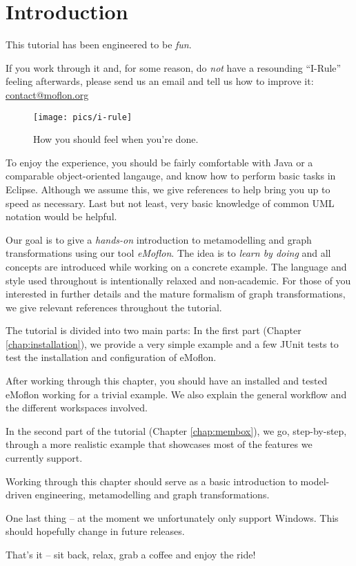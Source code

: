 \chapter{Introduction}
\label{chap:introduction}

This tutorial has been engineered to be \emph{fun}.

If you work through it and, for some reason, do \emph{not} have a resounding
``I-Rule'' feeling afterwards, please send us an email and tell us how to improve it:
\url{contact@moflon.org}

\begin{figure}[htp]
\begin{center}
  \texttt{[image: pics/i-rule]}
  \caption{How you should feel when you're done.}
  \label{i-rule}
\end{center}
\end{figure}

\newpage 

To enjoy the experience, you should be fairly comfortable with Java or
a comparable object-oriented langauge, and know how to perform basic tasks
in Eclipse.  Although we assume this, we give references to help bring you up to
speed as necessary.  Last but not least, very basic knowledge of
common UML notation would be helpful.

Our goal is to give a \emph{hands-on} introduction to metamodelling and graph
transformations using our tool \emph{eMoflon}.
The idea is to \emph{learn by doing} and all concepts are introduced while
working on a concrete example.
The language and style used throughout is intentionally relaxed and
non-academic.
For those of you interested in further details and the mature
formalism of graph transformations, we give relevant references throughout the
tutorial.

The tutorial is divided into two main parts:  In the first part (Chapter
\ref{chap:installation}), we provide a very simple example and a few JUnit tests
to test the installation and configuration of eMoflon.

After working through this chapter, you should have an installed
and tested eMoflon working for a trivial example.
We also explain the general workflow and the different workspaces involved.

In the second part of the tutorial (Chapter \ref{chap:membox}), we go,
step-by-step, through a more realistic example that showcases most of the
features we currently support.

Working through this chapter should serve as a basic introduction to
model-driven engineering, metamodelling and graph
transformations.

One last thing -- at the moment we unfortunately only support Windows.
This should hopefully change in future releases.

That's it -- sit back, relax, grab a coffee and enjoy the ride!


